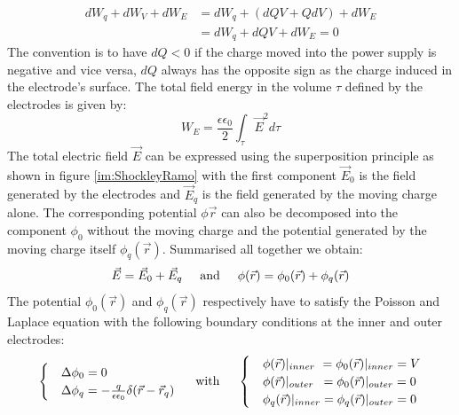 		\begin{equation}
			\begin{split}
				dW_q + dW_V + dW_E 	&= dW_q + (dQV + QdV) + dW_E\\
				 										&= dW_q + dQV  + dW_E = 0
			\end{split}
		\end{equation}
		The convention is to have $dQ < 0$ if the charge moved into the power supply is negative and vice versa, $dQ$ always has the opposite sign as the charge induced in the electrode's surface. The total field energy in the volume $\tau$ defined by the electrodes is given by: 
		\begin{equation}
			W_E = \frac{\epsilon \epsilon_0}{2} \int_{\tau} \vec{E}^2 d\tau
		\end{equation}
		The total electric field $\vec{E}$ can be expressed using the superposition principle as shown in figure \ref{im:ShockleyRamo} with the first component $\vec{E}_0$ is the field generated by the electrodes and $\vec{E}_q$ is the field generated by the moving charge alone. The corresponding potential $\phi{\vec{r}}$ can also be decomposed into the component $\phi_0$ without the moving charge and the potential generated by the moving charge itself $\phi_q(\vec{r})$. Summarised all together we obtain: 
		\begin{equation}
			\vec{E} = \vec{E}_0 + \vec{E}_q \hspace{5mm} \text{and} \hspace{5mm} \phi(\vec{r}) = \phi_0(\vec{r}) + \phi_q(\vec{r})
		\end{equation}
		The potential $\phi_0(\vec{r})$ and $\phi_q(\vec{r})$ respectively have to satisfy the Poisson and Laplace equation with the following boundary conditions at the inner and outer electrodes: 
		\begin{equation}
			\begin{cases}
				&\Delta \phi_0 = 0 \\
				&\Delta \phi_q = -\frac{q}{\epsilon \epsilon_0} \delta(\vec{r} - \vec{r}_q)
			\end{cases}
			\hspace{5mm} \text{with} \hspace{5mm}
			\begin{cases}
				&\phi(\vec{r})|_{inner}\ = \phi_0({\vec{r}})|_{inner} = V \\
				&\phi(\vec{r})|_{outer}\hspace{1.8mm} = \phi_0({\vec{r}})|_{outer} = 0 \\
				&\phi_q(\vec{r})|_{inner} = \phi_q({\vec{r}})|_{outer} = 0 \\
			\end{cases}
		\end{equation}
